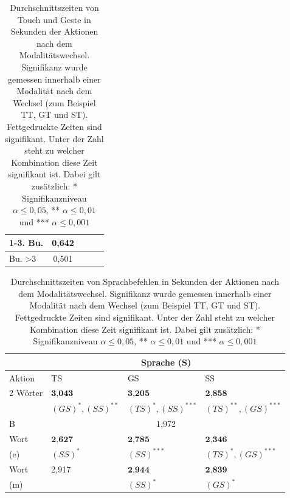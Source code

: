 \begin{table}[ht]
\begin{tabular}{|l|l|l|l|l|l|l|}
		\hline
		1-3. Bu.		& \multicolumn{3}{|c|}{0,642} &				& 			&  	 \\
		\hline
		Bu. >3 					& \multicolumn{3}{|c|}{0,501} &				& 		&  		\\
		\hline
  \end{tabular}
	\caption[Zweite Vereinfachung der Durchschnittszeiten von Touch und Geste nach dem Modalitätswechsel]{Durchschnittszeiten von Touch und Geste in Sekunden der Aktionen nach dem Modalitätswechsel. Signifikanz wurde gemessen innerhalb einer Modalität nach dem Wechsel (zum Beispiel TT, GT und ST). Fettgedruckte Zeiten sind signifikant. Unter der Zahl steht zu welcher Kombination diese Zeit signifikant ist. Dabei gilt zusätzlich: * Signifikanzniveau $\alpha \leq 0,05$, ** $\alpha \leq 0,01$ und *** $\alpha \leq 0,001$}
	\label{tab:OperatorzeitenNachWechsel3_TouchGeste}
\end{table}
\begin{table}[ht]
  \centering
	\begin{tabular}{|l|l|l|l|}
		\hline
		& \multicolumn{3}{|c|}{Sprache (S)}\\
		\hline
		Aktion 					&TS 	& GS 	& SS\\
		\hline
		2 Wörter		&	$\textbf{3,043}$						& $\textbf{3,205}$							& $\textbf{2,858}$\\
								&	\small{$(GS)^{*},(SS)^{**}$}	& \small{$(TS)^{*},(SS)^{***}$}	& \small{$(TS)^{**},(GS)^{***}$}\\
		\hline
		B						&\multicolumn{3}{|c|}{1,972}\\
		\hline
		Wort   		& $\textbf{2,627}$	& $\textbf{2,785}$		& $\textbf{2,346}$ \\
		(e)						& \small{$(SS)^{*}$}& \small{$(SS)^{***}$}	& \small{$(TS)^{*},(GS)^{***}$} \\
		\hline
		Wort  			& 2,917 & $\textbf{2,944}$ 	& $\textbf{2,839}$ \\
		(m)						& 			& \small{$(SS)^{*}$} & \small{$(GS)^{*}$} \\
		\hline
  \end{tabular}
	\caption[Zweite Vereinfachung der Durchschnittszeiten von Sprache nach dem Modalitätswechsel]{Durchschnittszeiten von Sprachbefehlen in Sekunden der Aktionen nach dem Modalitätswechsel. Signifikanz wurde gemessen innerhalb einer Modalität nach dem Wechsel (zum Beispiel TT, GT und ST). Fettgedruckte Zeiten sind signifikant. Unter der Zahl steht zu welcher Kombination diese Zeit signifikant ist. Dabei gilt zusätzlich: * Signifikanzniveau $\alpha \leq 0,05$, ** $\alpha \leq 0,01$ und *** $\alpha \leq 0,001$}
	\label{tab:OperatorzeitenNachWechsel3_Sprache}
\end{table}
\clearpage
